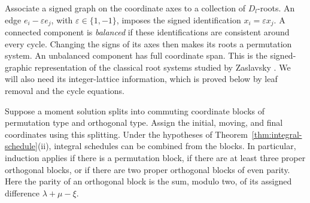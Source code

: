 Associate a signed graph on the coordinate axes to a collection of
\(D_l\)-roots.  An edge \(e_i-\varepsilon e_j\), with
\(\varepsilon\in\{1,-1\}\), imposes the signed identification
\(x_i=\varepsilon x_j\).  A connected component is \emph{balanced} if
these identifications are consistent around every cycle.  Changing the
signs of its axes then makes its roots a permutation system.  An
unbalanced component has full coordinate span.
This is the signed-graphic representation of the classical root
systems studied by Zaslavsky \cite{Zas82,Zas12}. We will also need its
integer-lattice information, which is proved below by leaf removal
and the cycle equations.

\begin{lemma}\label{lem:block-reduction}
Suppose a moment solution splits into commuting coordinate blocks of
permutation type and orthogonal type.  Assign the initial, moving, and
final coordinates using this splitting.  Under the hypotheses of
Theorem~\ref{thm:integral-schedule}\textup{(ii)}, integral schedules can be
combined from the blocks.  In particular, induction applies if there is
a permutation block, if there are at least three proper orthogonal
blocks, or if there are two proper orthogonal blocks of even parity.
Here the parity of an orthogonal block is the sum, modulo two, of its
assigned difference \(\lambda+\mu-\xi\).
\end{lemma}

